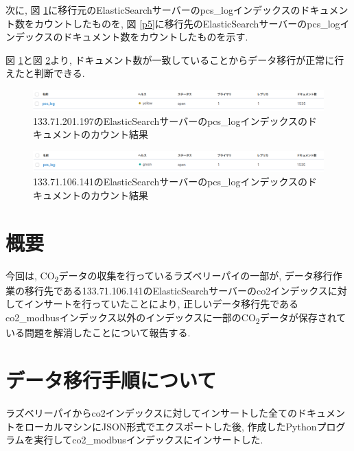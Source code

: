 次に, 図 \ref{p18}に移行元のElasticSearchサーバーのpcs\_logインデックスのドキュメント数をカウントしたものを, 図 \ref{p5}に移行先のElasticSearchサーバーのpcs\_logインデックスのドキュメント数をカウントしたものを示す.

図 \ref{p18}と図 \ref{p19}より, ドキュメント数が一致していることからデータ移行が正常に行えたと判断できる.

\begin{figure}[!ht]
    \begin{center}
        \includegraphics[width=160mm]{sotu/figure/197pcs.png}
        \caption{133.71.201.197のElasticSearchサーバーのpcs\_logインデックスのドキュメントのカウント結果}
        \label{p18}
    \end{center}
\end{figure}

\begin{figure}[!ht]
    \begin{center}
        \includegraphics[width=160mm]{sotu/figure/141pcs.png}
        \caption{133.71.106.141のElasticSearchサーバーのpcs\_logインデックスのドキュメントのカウント結果}
        \label{p19}
    \end{center}
\end{figure}

\section{概要}
今回は, CO\textsubscript{2}データの収集を行っているラズベリーパイの一部が, データ移行作業の移行先である133.71.106.141のElasticSearchサーバーのco2インデックスに対してインサートを行っていたことにより, 正しいデータ移行先であるco2\_modbusインデックス以外のインデックスに一部のCO\textsubscript{2}データが保存されている問題を解消したことについて報告する.

\section{データ移行手順について}

ラズベリーパイからco2インデックスに対してインサートした全てのドキュメントをローカルマシンにJSON形式でエクスポートした後, 作成したPythonプログラムを実行してco2\_modbusインデックスにインサートした.

